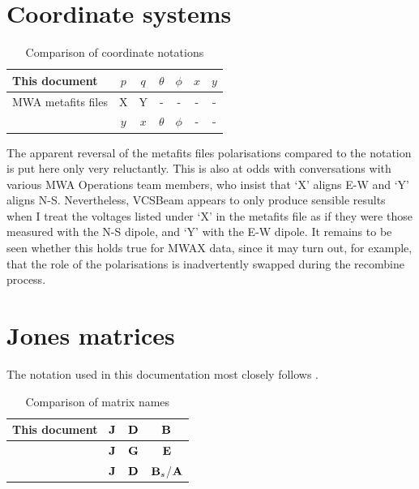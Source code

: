 \documentclass{book}
\newcommand{\vcsbeam}{{\sc VCSBeam}}
\begin{document}
\section{Coordinate systems}

\begin{table}[!hb]
    \centering
    \caption{Comparison of coordinate notations}
    \label{tbl:notations}
    \begin{tabular}{l|cc|cc|cc}
        This document & $p$ & $q$ & $\theta$ & $\phi$ & $x$ & $y$ \\
        \hline
        MWA metafits files       & X & Y & - & - & - & - \\
        \citet{Sokolowski2017} & $y$ & $x$ & $\theta$ & $\phi$ & - & - \\
    \end{tabular}
\end{table}

The apparent reversal of the metafits files polarisations compared to the \citet{Sokolowski2017} notation is put here only very reluctantly.
This is also at odds with conversations with various MWA Operations team members, who insist that `X' aligns E-W and `Y' aligns N-S.
Nevertheless, \vcsbeam{} appears to only produce sensible results when I treat the voltages listed under `X' in the metafits file as if they were those measured with the N-S dipole, and `Y' with the E-W dipole.
It remains to be seen whether this holds true for MWAX data, since it may turn out, for example, that the role of the polarisations is inadvertently swapped during the recombine process.

\section{Jones matrices}
\label{sec:jones_matrices}

The notation used in this documentation most closely follows \citet{Ord2019}.

\begin{table}[!hb]
    \centering
    \caption{Comparison of matrix names}
    \label{tbl:notations}
    \begin{tabular}{l|ccc}
        This document & ${\bf J}$ & ${\bf D}$ & ${\bf B}$ \\
        \hline
        \citet{Sokolowski2017} & ${\bf J}$ & ${\bf G}$ & ${\bf E}$ \\
        \citet{Ord2019} & ${\bf J}$ & ${\bf D}$ & ${\bf B}_s$/${\bf A}$ \\
    \end{tabular}
\end{table}

\printindex


\end{document}
